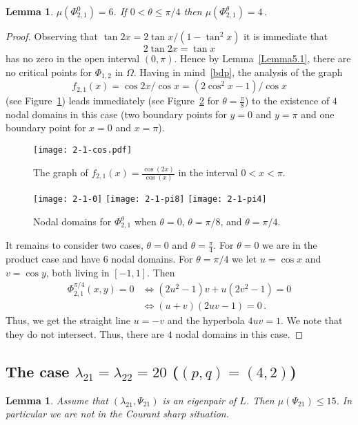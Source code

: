 \documentclass[a4paper,reqno,11pt]{amsart}
\newtheorem{lemma}[thm]{Lemma}
\theoremstyle{remark}
\theoremstyle{definition}
\numberwithin{equation}{section}
\begin{document}
\begin{lemma}
\label{lem:2-1}
$\mu(\Phi_{2,1}^0)=6$. If $0<\theta\leq \pi/4$ then $\mu(\Phi_{2,1}^\theta)=4\,$.
\end{lemma}

\begin{proof}
Observing that $\tan 2x = 2\tan x/(1-\tan^2 x)$  it is immediate that 
\[
2\tan 2x = \tan x
\]
has no zero in the open interval $(0,\pi)$. Hence by Lemma~\ref{Lemma5.1},  
there are no  critical points for $\Phi_{1,2}$ in $\Omega$. Having in 
mind~\eqref{bdp}, the analysis of the graph
\[
f_{2,1}(x) = \cos 2x/\cos x = (2 \cos^2 x -1)/\cos x
\]
(see Figure~\ref{fig:2-1-cos}) leads immediately (see Figure~\ref{fig:2-1} for 
$\theta=\frac \pi 8$) to the existence of $4$ 
nodal domains in this case (two boundary points for $y=0$ and $y=\pi$ and 
one boundary point for $x=0$ and $x=\pi$).

\begin{figure}[htbp]
\centering
\texttt{[image: 2-1-cos.pdf]}
\caption{The graph of $f_{2,1}(x)=\frac{\cos(2x)}{\cos(x)}$ in the interval 
$0<x<\pi$.}
\label{fig:2-1-cos}
\end{figure}

\begin{figure}[htp]
\centering
\texttt{[image: 2-1-0]}
\hskip 1cm
\texttt{[image: 2-1-pi8]}
\hskip 1cm
\texttt{[image: 2-1-pi4]}
\caption{Nodal domains for $\Phi_{2,1}^\theta$ when $\theta=0$, $\theta=\pi/8$,
 and $\theta=\pi/4$.}
\label{fig:2-1}
\end{figure}

It remains to consider two cases, $\theta=0$ and  $\theta=\frac{\pi}{4}$.
For $\theta=0$ we are in the product case and have $6$ nodal domains.
For $\theta=\pi/4$ we let $u=\cos x$ and $v=\cos y$, both living in $[-1,1]$. 
Then 
\[
\begin{aligned}
\Phi_{2,1}^{\pi/4}(x,y)=0 &\iff (2u^2-1)v+u(2v^2-1)=0\\
&\iff (u+v)(2uv-1)=0\,.
\end{aligned}
\]
Thus, we get the straight line $u=-v$ and the hyperbola $4uv=1$. We note that
they do not intersect. Thus, there are $4$ nodal domains in this case.
\end{proof}

\subsection{The case $\lambda_{21}=\lambda_{22}=20$ ($(p,q)=(4,2)$)}
\begin{lemma}
\label{lem:4-2}
Assume that $(\lambda_{21},\Psi_{21})$ is an eigenpair of $L$. Then
$\mu(\Psi_{21})\leq 15$. In particular we are not in the Courant sharp 
situation.
\end{lemma}
\end{document}
